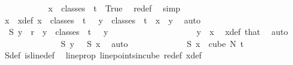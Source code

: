 \begin{isabellebody}
\isanewline
\ \ \ \ \ \ \ \ \isamarkupfalse%
\ \isamarkupfalse%
\ {\isachardoublequoteopen}{\isasymexists}{\isacharbang}{\kern0pt}x\ {\isasymin}\ classes\ {}\ t\ {}{\isachardot}{\kern0pt}\ True{\isachardoublequoteclose}\ \isamarkupfalse%
\ redef\ \isamarkupfalse%
\ simp\isanewline
\ \ \ \ \ \ \ \ \isamarkupfalse%
\ \isamarkupfalse%
\ x\ \ x{\isacharunderscore}{\kern0pt}def{\isacharcolon}{\kern0pt}\ {\isachardoublequoteopen}x\ {\isasymin}\ classes\ {}\ t\ {}\ {\isasymand}\ {\isacharparenleft}{\kern0pt}{\isasymforall}y\ {\isasymin}\ classes\ {}\ t\ {}{\isachardot}{\kern0pt}\ x\ {\isacharequal}{\kern0pt}\ y{\isacharparenright}{\kern0pt}{\isachardoublequoteclose}\ \isamarkupfalse%
\ auto\isanewline
\isanewline
\ \ \ \ \ \ \ \ \isamarkupfalse%
\ {\isachardoublequoteopen}{\isasymchi}\ {\isacharparenleft}{\kern0pt}S{}\ y{\isacharparenright}{\kern0pt}\ {\isacharless}{\kern0pt}\ r{\isachardoublequoteclose}\ \ {\isachardoublequoteopen}y\ {\isasymin}\ classes\ {}\ t\ {}{\isachardoublequoteclose}\ \ y\isanewline
\ \ \ \ \ \ \ \ \isamarkupfalse%
{\isacharminus}{\kern0pt}\isanewline
\ \ \ \ \ \ \ \ \ \ \isamarkupfalse%
\ {\isachardoublequoteopen}y\ {\isacharequal}{\kern0pt}\ x{\isachardoublequoteclose}\ \isamarkupfalse%
\ x{\isacharunderscore}{\kern0pt}def\ that\ \isamarkupfalse%
\ auto\isanewline
\ \ \ \ \ \ \ \ \ \ \isamarkupfalse%
\ \isamarkupfalse%
\ {\isachardoublequoteopen}{\isasymchi}\ {\isacharparenleft}{\kern0pt}S{}\ y{\isacharparenright}{\kern0pt}\ {\isacharequal}{\kern0pt}\ {\isasymchi}\ {\isacharparenleft}{\kern0pt}S{}\ x{\isacharparenright}{\kern0pt}{\isachardoublequoteclose}\ \isamarkupfalse%
\ auto\isanewline
\ \ \ \ \ \ \ \ \ \ \isamarkupfalse%
\ \isamarkupfalse%
\ {\isachardoublequoteopen}S{}\ x\ {\isasymin}\ cube\ N{\isacharprime}{\kern0pt}\ {\isacharparenleft}{\kern0pt}t{\isacharplus}{\kern0pt}{}{\isacharparenright}{\kern0pt}{\isachardoublequoteclose}\ \isamarkupfalse%
\ S{}{\isacharunderscore}{\kern0pt}def\ is{\isacharunderscore}{\kern0pt}line{\isacharunderscore}{\kern0pt}def\ \isamarkupfalse%
\ line{\isacharunderscore}{\kern0pt}prop\ line{\isacharunderscore}{\kern0pt}points{\isacharunderscore}{\kern0pt}in{\isacharunderscore}{\kern0pt}cube\ redef\ x{\isacharunderscore}{\kern0pt}def\ \isamarkupfalse%

\end{isabellebody}
